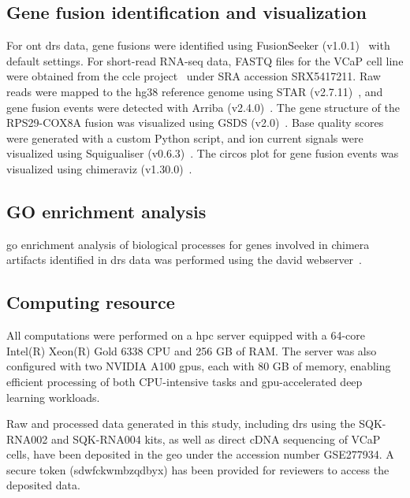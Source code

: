 \documentclass[pdflatex,sn-nature, lineno]{sn-jnl}%
\begin{document}
\subsection{Gene fusion identification and visualization}

For \gls{ont} \gls{drs} data, gene fusions were identified using FusionSeeker (v1.0.1)~\cite{chen2023gene} with default settings.
For short-read RNA-seq data, FASTQ files for the VCaP cell line were obtained from the \gls{ccle} project~\cite{barretina2012cancer} under SRA accession SRX5417211.
Raw reads were mapped to the hg38 reference genome using STAR (v2.7.11)~\cite{dobin2013star}, and gene fusion events were detected with Arriba (v2.4.0)~\cite{uhrig2021accurate}.
The gene structure of the RPS29-COX8A fusion was visualized using GSDS (v2.0)~\cite{hu2015gsds}.
Base quality scores were generated with a custom Python script, and ion current signals were visualized using Squigualiser (v0.6.3)~\cite{samarakoon2024interactive}.
The circos plot for gene fusion events was visualized using chimeraviz (v1.30.0)~\cite{laagstad2017chimeraviz}.

\subsection{GO enrichment analysis}

\gls{go} enrichment analysis of biological processes for genes involved in chimera artifacts identified in \gls{drs} data was performed using the \gls{david} webserver~\cite{sherman2022david}.

\subsection{Computing resource}

All computations were performed on a \gls{hpc} server equipped with a 64-core Intel(R) Xeon(R) Gold 6338 CPU and 256 GB of RAM. The server was also configured with two NVIDIA A100 \glspl{gpu}, each with 80 GB of memory, enabling efficient processing of both CPU-intensive tasks and \gls{gpu}-accelerated deep learning workloads.


Raw and processed data generated in this study, including \gls{drs} using the SQK-RNA002 and SQK-RNA004 kits, as well as direct cDNA sequencing of VCaP cells, have been deposited in the \gls{geo} under the accession number GSE277934.
A secure token (sdwfckwmbzqdbyx) has been provided for reviewers to access the deposited data.
\end{document}
